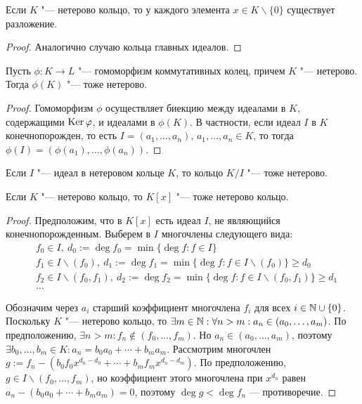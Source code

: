 \begin{corollary}
	Если $K$ "--- нетерово кольцо, то у каждого элемента $x \in K \backslash \{0\}$ существует разложение.
\end{corollary}

\begin{proof}
	Аналогично случаю кольца главных идеалов.
\end{proof}

\begin{proposition}
	Пусть $\phi: K \to L$ "--- гомоморфизм коммутативных колец, причем $K$ "--- нетерово. Тогда $\phi(K)$ "--- тоже нетерово.
\end{proposition}

\begin{proof}
	Гомоморфизм $\phi$ осуществляет биекцию между идеалами в $K$, содержащими $\operatorname{Ker}\varphi$, и идеалами в $\phi(K)$. В частности, если идеал $I$ в $K$ конечнопорожден, то есть $I = (a_1, \dotsc, a_n)$, $a_1, \dotsc, a_n \in K$, то тогда $\phi(I) = (\phi(a_1), \dotsc, \phi(a_n))$.
\end{proof}

\begin{corollary}
	Если $I$ "--- идеал в нетеровом кольце $K$, то кольцо $K / I$ "--- тоже нетерово.
\end{corollary}

\begin{theorem}
	Если $K$ "--- нетерово кольцо, то $K[x]$ "--- тоже нетерово кольцо.
\end{theorem}

\begin{proof}
	Предположим, что в $K[x]$ есть идеал $I$, не являющийся конечнопорожденным. Выберем в $I$ многочлены следующего вида:
	\begin{align*}
		&f_0 \in I,~d_0 := \deg{f_0} = \min\{\deg{f} : f \in I\}\\
		&f_1 \in I\backslash(f_0),~d_1 := \deg{f_1} = \min\{\deg{f} : f \in I\backslash(f_0)\} \ge d_0\\
		&f_2 \in I\backslash(f_0, f_1),~d_2 := \deg{f_2} = \min\{\deg{f} : f \in I\backslash(f_0, f_1)\} \ge d_1\\
		&\dotsc
	\end{align*}
	
	Обозначим через $a_i$ старший коэффициент многочлена $f_i$ для всех $i \in \mathbb{N} \cup \{0\}$. Поскольку $K$ "--- нетерово кольцо, то $\exists m \in \mathbb{N}: \forall n > m: a_n \in (a_0, \dotsc, a_m)$. По предположению, $\exists n > m: f_n \not\in (f_0, \dotsc, f_m)$. Но $a_n \in (a_0, \dotsc, a_m)$, поэтому $\exists b_0, \dotsc, b_m \in K: a_n = b_0a_0 + \dotsb + b_ma_m$. Рассмотрим многочлен $g := f_n - (b_0f_0x^{d_n - d_0} + \dotsb + b_mf_mx^{d_n - d_m})$. По предположению, $g \in I\backslash(f_0, \dotsc, f_m)$, но коэффициент этого многочлена при $x^{d_n}$ равен $a_n - (b_0a_0 + \dotsb + b_ma_m) = 0$, поэтому $\deg{g} < \deg{f_n}$ --- противоречие.
\end{proof}